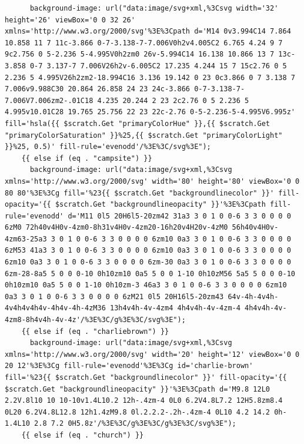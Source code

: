 \documentclass[11pt]{article}
\begin{document}
\begin{enumerate}
\begin{verbatim}
      background-image: url("data:image/svg+xml,%3Csvg width='32' height='26' viewBox='0 0 32 26' xmlns='http://www.w3.org/2000/svg'%3E%3Cpath d='M14 0v3.994C14 7.864 10.858 11 7 11c-3.866 0-7-3.138-7-7.006V0h2v4.005C2 6.765 4.24 9 7 9c2.756 0 5-2.236 5-4.995V0h2zm0 26v-5.994C14 16.138 10.866 13 7 13c-3.858 0-7 3.137-7 7.006V26h2v-6.005C2 17.235 4.244 15 7 15c2.76 0 5 2.236 5 4.995V26h2zm2-18.994C16 3.136 19.142 0 23 0c3.866 0 7 3.138 7 7.006v9.988C30 20.864 26.858 24 23 24c-3.866 0-7-3.138-7-7.006V7.006zm2-.01C18 4.235 20.244 2 23 2c2.76 0 5 2.236 5 4.995v10.01C28 19.765 25.756 22 23 22c-2.76 0-5-2.236-5-4.995V6.995z' fill='hsla({{ $scratch.Get "primaryColorHue" }},{{ $scratch.Get "primaryColorSaturation" }}%25,{{ $scratch.Get "primaryColorLight" }}%25, 0.5)' fill-rule='evenodd'/%3E%3C/svg%3E");
    {{ else if (eq . "campsite") }}
      background-image: url("data:image/svg+xml,%3Csvg xmlns='http://www.w3.org/2000/svg' width='80' height='80' viewBox='0 0 80 80'%3E%3Cg fill='%23{{ $scratch.Get "backgroundlinecolor" }}' fill-opacity='{{ $scratch.Get "backgroundlineopacity" }}'%3E%3Cpath fill-rule='evenodd' d='M11 0l5 20H6l5-20zm42 31a3 3 0 1 0 0-6 3 3 0 0 0 0 6zM0 72h40v4H0v-4zm0-8h31v4H0v-4zm20-16h20v4H20v-4zM0 56h40v4H0v-4zm63-25a3 3 0 1 0 0-6 3 3 0 0 0 0 6zm10 0a3 3 0 1 0 0-6 3 3 0 0 0 0 6zM53 41a3 3 0 1 0 0-6 3 3 0 0 0 0 6zm10 0a3 3 0 1 0 0-6 3 3 0 0 0 0 6zm10 0a3 3 0 1 0 0-6 3 3 0 0 0 0 6zm-30 0a3 3 0 1 0 0-6 3 3 0 0 0 0 6zm-28-8a5 5 0 0 0-10 0h10zm10 0a5 5 0 0 1-10 0h10zM56 5a5 5 0 0 0-10 0h10zm10 0a5 5 0 0 1-10 0h10zm-3 46a3 3 0 1 0 0-6 3 3 0 0 0 0 6zm10 0a3 3 0 1 0 0-6 3 3 0 0 0 0 6zM21 0l5 20H16l5-20zm43 64v-4h-4v4h-4v4h4v4h4v-4h4v-4h-4zM36 13h4v4h-4v-4zm4 4h4v4h-4v-4zm-4 4h4v4h-4v-4zm8-8h4v4h-4v-4z'/%3E%3C/g%3E%3C/svg%3E");
    {{ else if (eq . "charliebrown") }}
      background-image: url("data:image/svg+xml,%3Csvg xmlns='http://www.w3.org/2000/svg' width='20' height='12' viewBox='0 0 20 12'%3E%3Cg fill-rule='evenodd'%3E%3Cg id='charlie-brown' fill='%23{{ $scratch.Get "backgroundlinecolor" }}' fill-opacity='{{ $scratch.Get "backgroundlineopacity" }}'%3E%3Cpath d='M9.8 12L0 2.2V.8l10 10 10-10v1.4L10.2 12h-.4zm-4 0L0 6.2V4.8L7.2 12H5.8zm8.4 0L20 6.2V4.8L12.8 12h1.4zM9.8 0l.2.2.2-.2h-.4zm-4 0L10 4.2 14.2 0h-1.4L10 2.8 7.2 0H5.8z'/%3E%3C/g%3E%3C/g%3E%3C/svg%3E");
    {{ else if (eq . "church") }}

\end{verbatim}
\end{enumerate}
\end{document}
